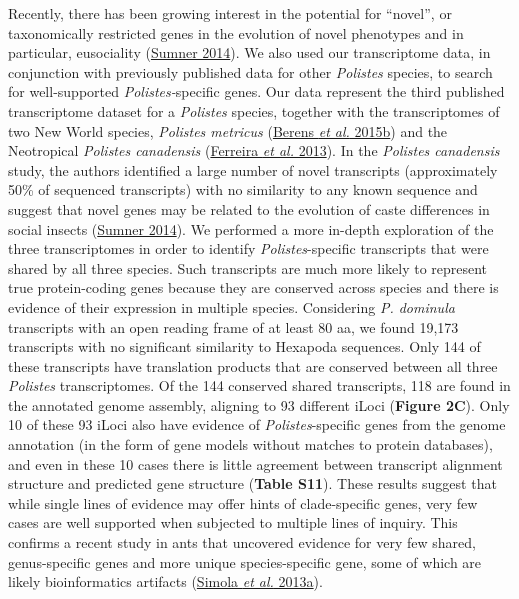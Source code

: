 \documentclass[]{article}
\begin{document}
Recently, there has been growing interest in the potential for
``novel'', or taxonomically restricted genes in the evolution of novel
phenotypes and in particular, eusociality
(\protect\hyperlink{ux5fENREFux5f58}{Sumner 2014}). We also used our
transcriptome data, in conjunction with previously published data for
other \emph{Polistes} species, to search for well-supported
\emph{Polistes-}specific genes. Our data represent the third published
transcriptome dataset for a \emph{Polistes} species, together with the
transcriptomes of two New World species, \emph{Polistes metricus}
(\protect\hyperlink{ux5fENREFux5f3}{Berens \emph{et al.} 2015b}) and the
Neotropical \emph{Polistes canadensis}
(\protect\hyperlink{ux5fENREFux5f10}{Ferreira \emph{et al.} 2013}). In
the \emph{Polistes canadensis} study, the authors identified a large
number of novel transcripts (approximately 50\% of sequenced
transcripts) with no similarity to any known sequence and suggest that
novel genes may be related to the evolution of caste differences in
social insects (\protect\hyperlink{ux5fENREFux5f58}{Sumner 2014}). We
performed a more in-depth exploration of the three transcriptomes in
order to identify \emph{Polistes}-specific transcripts that were shared
by all three species. Such transcripts are much more likely to represent
true protein-coding genes because they are conserved across species and
there is evidence of their expression in multiple species. Considering
\emph{P. dominula} transcripts with an open reading frame of at least 80
aa, we found 19,173 transcripts with no significant similarity to
Hexapoda sequences. Only 144 of these transcripts have translation
products that are conserved between all three \emph{Polistes}
transcriptomes. Of the 144 conserved shared transcripts, 118 are found
in the annotated genome assembly, aligning to 93 different iLoci
(\textbf{Figure 2C}). Only 10 of these 93 iLoci also have evidence of
\emph{Polistes}-specific genes from the genome annotation (in the form
of gene models without matches to protein databases), and even in these
10 cases there is little agreement between transcript alignment
structure and predicted gene structure (\textbf{Table S11}). These
results suggest that while single lines of evidence may offer hints of
clade-specific genes, very few cases are well supported when subjected
to multiple lines of inquiry. This confirms a recent study in ants that
uncovered evidence for very few shared, genus-specific genes and more
unique species-specific gene, some of which are likely bioinformatics
artifacts (\protect\hyperlink{ux5fENREFux5f52}{Simola \emph{et al.}
2013a}).
\end{document}

